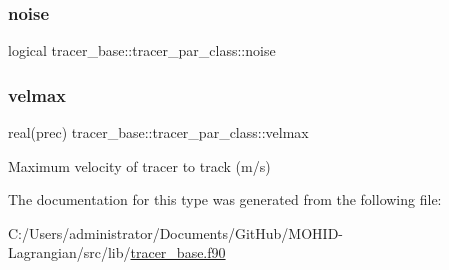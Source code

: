 \subsubsection{\texorpdfstring{noise}{noise}}
{\footnotesize\ttfamily logical tracer\+\_\+base\+::tracer\+\_\+par\+\_\+class\+::noise\hspace{0.3cm}{\ttfamily [private]}}

\mbox{\label{structtracer__base_1_1tracer__par__class_a7a6df785a9abc654a774b25fedb3c1e6}} 
\subsubsection{\texorpdfstring{velmax}{velmax}}
{\footnotesize\ttfamily real(prec) tracer\+\_\+base\+::tracer\+\_\+par\+\_\+class\+::velmax\hspace{0.3cm}{\ttfamily [private]}}



Maximum velocity of tracer to track (m/s) 



The documentation for this type was generated from the following file\+:\begin{DoxyCompactItemize}
\item 
C\+:/\+Users/administrator/\+Documents/\+Git\+Hub/\+M\+O\+H\+I\+D-\/\+Lagrangian/src/lib/\mbox{\hyperlink{tracer__base_8f90}{tracer\+\_\+base.\+f90}}\end{DoxyCompactItemize}
